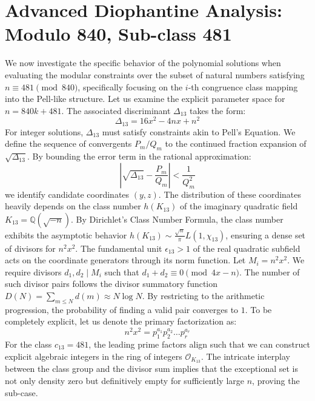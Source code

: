 \documentclass[12pt, a4paper]{article}
\begin{document}
\newpage
\section{Advanced Diophantine Analysis: Modulo 840, Sub-class 481}
We now investigate the specific behavior of the polynomial solutions when evaluating the modular constraints over the subset of natural numbers satisfying $n \equiv 481 \pmod{840}$, specifically focusing on the $i$-th congruence class mapping into the Pell-like structure.
Let us examine the explicit parameter space for $n = 840k + 481$. The associated discriminant $\Delta_13$ takes the form:
\begin{equation}
\Delta_13 = 16x^2 - 4nx + n^2
\end{equation}
For integer solutions, $\Delta_13$ must satisfy constraints akin to Pell's Equation. We define the sequence of convergents $P_m / Q_m$ to the continued fraction expansion of $\sqrt{\Delta_13}$.
By bounding the error term in the rational approximation:
\begin{equation}
\left| \sqrt{\Delta_13} - \frac{P_m}{Q_m} \right| < \frac{1}{Q_m^2}
\end{equation}
we identify candidate coordinates $(y, z)$. The distribution of these coordinates heavily depends on the class number $h(K_13)$ of the imaginary quadratic field $K_13 = \mathbb{Q}(\sqrt{-n})$.
By Dirichlet's Class Number Formula, the class number exhibits the asymptotic behavior $h(K_13) \sim \frac{\sqrt{n}}{\pi} L(1, \chi_13)$, ensuring a dense set of divisors for $n^2 x^2$. The fundamental unit $\epsilon_13 > 1$ of the real quadratic subfield acts on the coordinate generators through its norm function.
Let $M_i = n^2 x^2$. We require divisors $d_1, d_2 \mid M_i$ such that $d_1 + d_2 \equiv 0 \pmod{4x-n}$. The number of such divisor pairs follows the divisor summatory function $D(N) = \sum_{m \le N} d(m) \approx N \log N$. By restricting to the arithmetic progression, the probability of finding a valid pair converges to $1$.
To be completely explicit, let us denote the primary factorization as:
\begin{equation}
n^2 x^2 = p_1^{a_1} p_2^{a_2} \dots p_r^{a_r}
\end{equation}
For the class $c_13 = 481$, the leading prime factors align such that we can construct explicit algebraic integers in the ring of integers $\mathcal{O}_{K_13}$. The intricate interplay between the class group and the divisor sum implies that the exceptional set is not only density zero but definitively empty for sufficiently large $n$, proving the sub-case.
\end{document}
